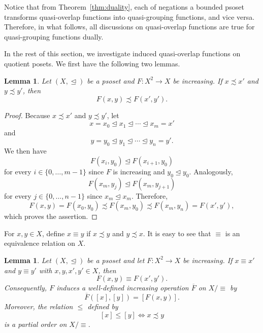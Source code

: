 \documentclass[preprint,12pt]{elsarticle}
\newtheorem{lemma}[theorem]{Lemma}
\newtheorem{remark}[theorem]{Remark}
\begin{document}
Notice that from Theorem~\ref{thm:duality}, each of negations a bounded psoset transforms quasi-overlap functions into quasi-grouping functions, and vice versa. Therefore, in what follows, all discussions on quasi-overlap functions are true for quasi-grouping functions dually.

In the rest of this section, we investigate induced quasi-overlap functions on quotient posets. We first have the following two lemmas.
\begin{lemma}\label{lem:path-preservation}
Let $(X,\trianglelefteq)$ be a psoset and $F:X^2\to X$ be increasing. If $x\precsim x'$ and $y\precsim y'$, then
$$
 F(x,y)\precsim F(x',y').
$$
\end{lemma}

\begin{proof}
Because $x\precsim x'$ and $y\precsim y'$, let
$$
 x=x_0\trianglelefteq x_1\trianglelefteq\cdots\trianglelefteq x_m=x'
$$
and
$$
 y=y_0\trianglelefteq y_1\trianglelefteq\cdots\trianglelefteq y_n=y'.
$$
We then have
$$
 F(x_i,y_0)\trianglelefteq F(x_{i+1},y_0)
$$ for every $i\in\{0,\ldots,m-1\}$ since $F$ is increasing and $y_0\trianglelefteq y_0$.
Analogously,
$$
 F(x_m,y_j)\trianglelefteq F(x_m,y_{j+1})
$$ for every $j\in\{0,\ldots,n-1\}$ since $x_m\trianglelefteq x_m$. Therefore,
$$
 F(x,y)=F(x_0,y_0)\precsim F(x_m,y_0)\precsim F(x_m,y_n)=F(x',y'),
$$
which proves the assertion.
\end{proof}

For $x,y\in X$, define $x\equiv y$ if $x\precsim y$ and $y\precsim x$. It is easy to see that $\equiv$ is an equivalence relation on $X$.

\begin{lemma}\label{lemm:scc-operation}
Let $(X,\trianglelefteq)$ be a psoset and let $F:X^2\to X$ be increasing. If $x\equiv x'$ and $y\equiv y'$ with $x, y, x', y'\in X$, then
$$
 F(x,y)\equiv F(x',y').
$$
Consequently, $F$ induces a well-defined increasing operation $\overline F$ on $X/{\equiv}$ by
$$
 \overline F([x],[y])=[F(x,y)].
$$
Moreover, the relation $\leq$ defined by
$$
 [x]\leq[y]\Longleftrightarrow x\precsim y
$$
is a partial order on $X/{\equiv}$.
\end{lemma}
\end{document}

